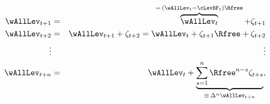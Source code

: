 \begin{eqnarray*}
        \wAllLev_{t+1} & = & \overbrace{\wAllLev_{t}}^{=\,(\wAllLev_{t}-\cLevBF_{t})\Rfree}+\zeta_{t+1}  \\
        \wAllLev_{t+2} & = & \wAllLev_{t+1}+\zeta_{t+2}=\wAllLev_{t}+\zeta_{t+1}\Rfree + \zeta_{t+2}
\\ \vdots       &   & \vdots \nonumber
\\  \wAllLev_{t+n} & = & \wAllLev_{t}+\underbrace{\sum_{s=1}^{n} \Rfree^{n-s}\zeta_{t+s}}_{\equiv\,\Delta^{n} \wAllLev_{t+n}},
\end{eqnarray*}

